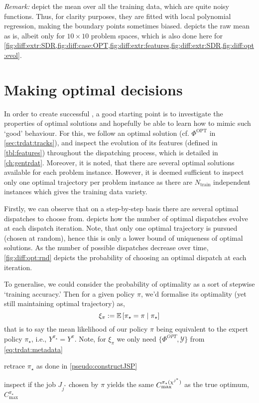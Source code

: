 \emph{Remark:}  
depict the mean over all the training data, which are quite noisy 
functions. Thus, for clarity purposes, they are fitted with local polynomial 
regression, making the boundary points sometimes biased. 
 depicts the raw mean as is, albeit only for $10\times10$ problem 
spaces, which is also done here for 
\cref{fig:diff:extr:SDR,fig:diff:case:OPT,fig:diff:extr:features,fig:diff:extr:SDR,fig:diff:opt:evol}.

\section{Making optimal decisions}
In order to create successful \dr, a good starting point is 
to investigate the properties of optimal solutions and hopefully be able to 
learn how to mimic such `good' behaviour. 
For this, we follow an optimal solution (cf. $\Phi^\text{OPT}$ in 
\cref{sec:trdat:tracks}),
and inspect the evolution of its features  (defined in \cref{tbl:features}) 
throughout the dispatching process, which is detailed in \cref{ch:gentrdat}. 
Moreover, it is noted, that there are several optimal solutions available for 
each problem instance. However, it is deemed sufficient to inspect only one 
optimal trajectory per problem instance as there are $N_{\text{train}}$ 
independent instances which gives the training data variety. 

Firstly, we can observe that on a step-by-step basis there are several optimal 
dispatches to choose from.  depicts how the number of 
optimal dispatches evolve at each dispatch iteration. Note, that only one 
optimal trajectory is pursued (chosen at random), hence this is only a lower 
bound of uniqueness of optimal solutions.
As the number of possible dispatches decrease over time, 
\cref{fig:diff:opt:rnd} 
depicts the probability of choosing an optimal dispatch at each iteration. 

To generalise, we could consider the probability of optimality as a sort of 
stepwise `training accuracy.' Then for a given policy $\pi$, we'd formalise its 
optimality (yet still maintaining optimal trajectory) as, 
\begin{equation} \label{eq:tracc:opt}
    \xi_{\pi} := \Exp{\given{\pi_{\star} = \pi}{\pi_{\star}}}
\end{equation}
that is to say the mean likelihood of our policy $\pi$ being equivalent to the 
expert policy $\pi_\star$, i.e., $Y^{\pi_\star}=Y^\pi$. Note, for $\xi_\pi$ we 
only need $\{\Phi^{OPT},\mathcal{Y}\}$ from \cref{eq:trdat:metadata}
\begin{enumerate*}
    \item retrace $\pi_\star$ as done in \cref{pseudo:constructJSP}
    \item inspect if the job $J_{j^*}$ chosen by $\pi$ yields the same 
    $C_{\max}^{\pi_\star({\mathbf{\chi}}^{j^*})}$ as the true optimum, 
    $C_{\max}^{\pi_\star}$
\end{enumerate*}

